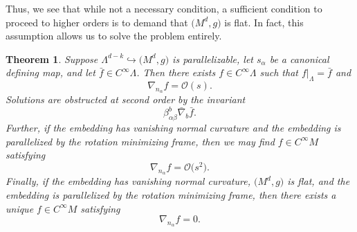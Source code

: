 \documentclass[pdftex]{sigma}
\numberwithin{equation}{section}
\newtheorem{Theorem}{Theorem}[section]
\renewcommand{\=}{\stackrel \Lambda =}
\begin{document}
Thus, we see that while not a necessary condition, a sufficient condition to proceed to higher orders is to demand that $\bigl(M^d,g\bigr)$ is flat. In fact, this assumption allows us to solve the problem entirely.
\begin{Theorem} \label{ho-extension}
Suppose $\Lambda^{d-k} \hookrightarrow \bigl(M^d,g\bigr)$ is parallelizable, let $s_{\alpha}$ be a canonical defining map, and let $\bar{f} \in C^\infty \Lambda$. Then there exists $f \in C^\infty \Lambda$ such that $f|_{\Lambda} = \bar{f}$ and
\[\nabla_{n_{\alpha}} f = \mathcal{O}(s) .\]
Solutions are obstructed at second order by the invariant
\[\beta^b_{\alpha \beta} \bar{\nabla}_b \bar{f} .\]
Further, if the embedding has vanishing normal curvature and the embedding is parallelized by the rotation minimizing frame, then we may find $f \in C^\infty M$ satisfying
\[\nabla_{n_{\alpha}} f = \mathcal{O}\bigl(s^2\bigr) .\]
Finally, if the embedding has vanishing normal curvature, $\bigl(M^d,g\bigr)$ is flat, and the embedding is parallelized by the rotation minimizing frame, then there exists a unique $f \in C^\infty M$ satisfying
\[\nabla_{n_{\alpha}} f = 0 .\]
\end{Theorem}
\end{document}
